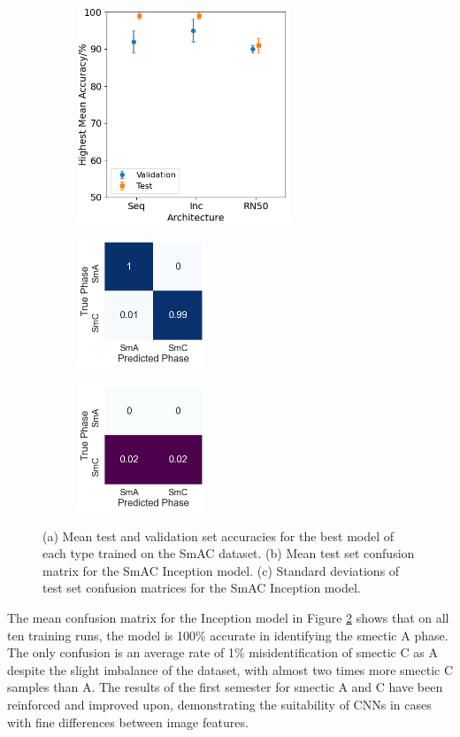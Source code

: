 \documentclass[12pt]{article}
\begin{document}
\begin{figure}[!h]
\centering
\begin{subfigure}{0.4\textwidth}
	\centering
	\includegraphics[width=2.5in]{images/Graphs/SmAC.png}
	\caption{}
	\label{smac:graph}
\end{subfigure}%
\begin{subfigure}{0.25\textwidth}
	\centering
	\includegraphics[width=1.5in]{images/ConMats/SmAC_mean.png}
	\caption{}
	\label{smac:mean}
\end{subfigure}%
\begin{subfigure}{0.25\textwidth}
	\centering
	\includegraphics[width=1.5in]{images/ConMats/SmAC_std.png}
	\caption{}
	\label{smac:std}
\end{subfigure}%
\caption{(a) Mean test and validation set accuracies for the best model of each type trained on the SmAC dataset. (b) Mean test set confusion matrix for the SmAC Inception model. (c) Standard deviations of test set confusion matrices for the SmAC Inception model.}
\label{smac:smac}
\end{figure}

The mean confusion matrix for the Inception model in Figure \ref{smac:mean} shows that on all ten training runs, the model is 100\% accurate in identifying the smectic A phase. The only confusion is an average rate of 1\% misidentification of smectic C as A despite the slight imbalance of the dataset, with almost two times more smectic C samples than A. The results of the first semester for smectic A and C have been reinforced and improved upon, demonstrating the suitability of CNNs in cases with fine differences between image features. 
\end{document}
